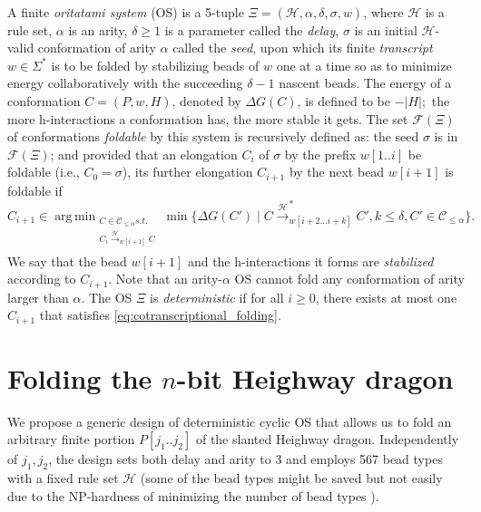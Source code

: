 \documentclass[runningheads]{llncs}
\DeclareMathOperator*{\argmin}{arg\,min}
\begin{document}
A finite \textit{oritatami system} (OS) is a 5-tuple $\Xi = (\mathcal{H}, \alpha, \delta, \sigma,w)$, where 
$\mathcal{H}$ is a rule set,
$\alpha$ is an arity, 
$\delta \geq 1$ is a parameter called the \textit{delay}, 
$\sigma$ is an initial $\mathcal{H}$-valid conformation of arity $\alpha$ called the \textit{seed}, upon which its finite \textit{transcript} $w \in \Sigma^*$ is to be folded by stabilizing beads of $w$ one at a time so as to minimize energy collaboratively with the succeeding $\delta -1$ nascent beads. 
The energy of a conformation $C = (P, w, H)$, denoted by $\Delta G(C)$, is defined to be $-|H|;$ the more h-interactions a conformation has, the more stable it gets.
The set $\mathcal{F}(\Xi)$ of conformations \textit{foldable} by this system is recursively defined as: 
the seed $\sigma$ is in $\mathcal{F}(\Xi)$; and provided that an elongation $C_{i}$ of $\sigma$ by the prefix $w[1..i]$ be foldable (i.e., $C_0 = \sigma$), its further elongation $C_{i+1}$ by the next bead $w[i+1]$ is foldable if
\begin{equation}\label{eq:cotranscriptional_folding}
C_{i+1} \in \argmin_{
\substack{
C \in \mathcal{C}_{\le \alpha} s.t. \\
C_i \xrightarrow{\mathcal{H}}_{w[i+1]}C \\
}
}
\min \Big\{ \Delta G(C') \mid 
C \xrightarrow{\mathcal{H}}^*_{w[i+2...i+k]}C', k\le \delta, C' \in \mathcal{C}_{\le \alpha}
\Big\}.
\end{equation}
We say that the bead $w[i+1]$ and the h-interactions it forms are \textit{stabilized} according to $C_{i+1}$.
Note that an arity-$\alpha$ OS cannot fold any conformation of arity larger than $\alpha$.
The OS $\Xi$ is \textit{deterministic} if for all $i \ge 0$, there exists at most one $C_{i+1}$ that satisfies \eqref{eq:cotranscriptional_folding}. 

	\section{Folding the $n$-bit Heighway dragon}

We propose a generic design of deterministic cyclic OS that allows us to fold an arbitrary finite portion $P[j_1 .. j_2]$ of the slanted Heighway dragon. 
Independently of $j_1, j_2$, the design sets both delay and arity to 3 and employs 567 bead types with a fixed rule set $\mathcal{H}$ (some of the bead types might be saved but not easily due to the NP-hardness of minimizing the number of bead types \cite{HanKim2017}). 
\end{document}

